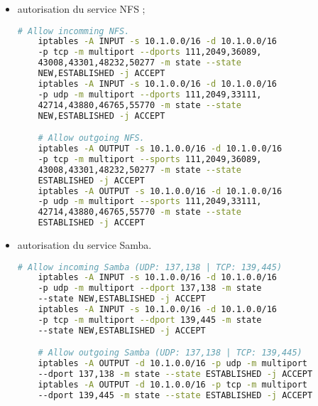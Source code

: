 \begin{itemize}
\item autorisation du service NFS ;

  \begin{lstlisting}[language=bash]
    # Allow incomming NFS.
    iptables -A INPUT -s 10.1.0.0/16 -d 10.1.0.0/16
    -p tcp -m multiport --dports 111,2049,36089,
    43008,43301,48232,50277 -m state --state
    NEW,ESTABLISHED -j ACCEPT
    iptables -A INPUT -s 10.1.0.0/16 -d 10.1.0.0/16
    -p udp -m multiport --dports 111,2049,33111,
    42714,43880,46765,55770 -m state --state
    NEW,ESTABLISHED -j ACCEPT

    # Allow outgoing NFS.
    iptables -A OUTPUT -s 10.1.0.0/16 -d 10.1.0.0/16
    -p tcp -m multiport --sports 111,2049,36089,
    43008,43301,48232,50277 -m state --state
    ESTABLISHED -j ACCEPT
    iptables -A OUTPUT -s 10.1.0.0/16 -d 10.1.0.0/16
    -p udp -m multiport --sports 111,2049,33111,
    42714,43880,46765,55770 -m state --state
    ESTABLISHED -j ACCEPT
  \end{lstlisting}

  \newpage

\item autorisation du service Samba.

  \begin{lstlisting}[language=bash]
    # Allow incoming Samba (UDP: 137,138 | TCP: 139,445)
    iptables -A INPUT -s 10.1.0.0/16 -d 10.1.0.0/16
    -p udp -m multiport --dport 137,138 -m state
    --state NEW,ESTABLISHED -j ACCEPT
    iptables -A INPUT -s 10.1.0.0/16 -d 10.1.0.0/16
    -p tcp -m multiport --dport 139,445 -m state
    --state NEW,ESTABLISHED -j ACCEPT

    # Allow outgoing Samba (UDP: 137,138 | TCP: 139,445)
    iptables -A OUTPUT -d 10.1.0.0/16 -p udp -m multiport
    --dport 137,138 -m state --state ESTABLISHED -j ACCEPT
    iptables -A OUTPUT -d 10.1.0.0/16 -p tcp -m multiport
    --dport 139,445 -m state --state ESTABLISHED -j ACCEPT
  \end{lstlisting}
\end{itemize}

